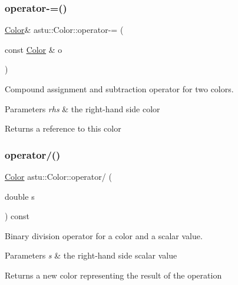 \subsubsection{\texorpdfstring{operator-\/=()}{operator-=()}}
{\footnotesize\ttfamily \hyperlink{classastu_1_1Color}{Color}\& astu\+::\+Color\+::operator-\/= (\begin{DoxyParamCaption}\item[{const \hyperlink{classastu_1_1Color}{Color} \&}]{o }\end{DoxyParamCaption})}

Compound assignment and subtraction operator for two colors.


\begin{DoxyParams}{Parameters}
{\em rhs} & the right-\/hand side color \\
\hline
\end{DoxyParams}
\begin{DoxyReturn}{Returns}
a reference to this color 
\end{DoxyReturn}
\mbox{\label{classastu_1_1Color_a9be3b7a9a3773bc7f82a2cd6ac6badbf}} 
\subsubsection{\texorpdfstring{operator/()}{operator/()}}
{\footnotesize\ttfamily \hyperlink{classastu_1_1Color}{Color} astu\+::\+Color\+::operator/ (\begin{DoxyParamCaption}\item[{double}]{s }\end{DoxyParamCaption}) const}

Binary division operator for a color and a scalar value.


\begin{DoxyParams}{Parameters}
{\em s} & the right-\/hand side scalar value \\
\hline
\end{DoxyParams}
\begin{DoxyReturn}{Returns}
a new color representing the result of the operation 
\end{DoxyReturn}
\mbox{\label{classastu_1_1Color_afd37b7940911dd15ef36bae5a046033c}} 
